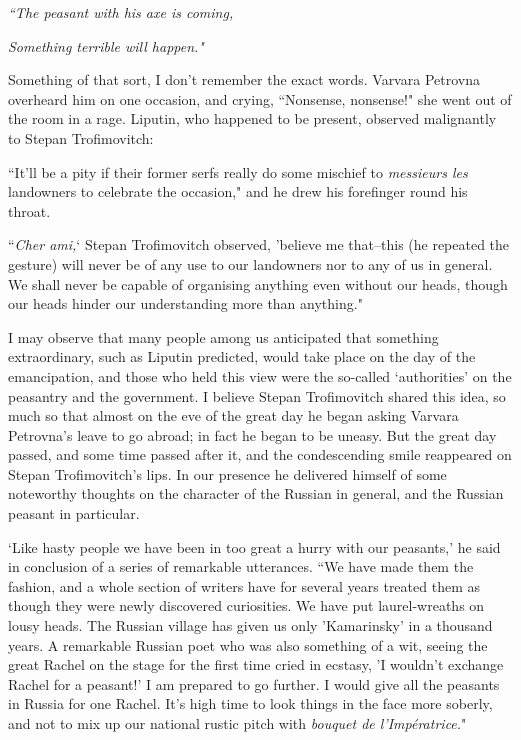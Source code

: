 \documentclass[12pt]{article}
\begin{document}
\vspace{12pt}
\emph{``The peasant with his axe is coming,}


\emph{Something terrible will happen."}




\vspace{12pt}
Something of that sort, I don't remember the exact words. Varvara
Petrovna overheard him on one occasion, and crying, ``Nonsense,
nonsense!" she went out of the room in a rage. Liputin, who happened to
be present, observed malignantly to Stepan Trofimovitch:


\vspace{12pt}
``It'll be a pity if their former serfs really do some mischief to
\emph{messieurs les} landowners to celebrate the occasion," and he drew his
forefinger round his throat.


\vspace{12pt}
``\emph{Cher ami,}` Stepan Trofimovitch observed, 'believe me that--this (he
repeated the gesture) will never be of any use to our landowners nor to
any of us in general. We shall never be capable of organising anything
even without our heads, though our heads hinder our understanding more
than anything."


\vspace{12pt}
I may observe that many people among us anticipated that something
extraordinary, such as Liputin predicted, would take place on the day
of the emancipation, and those who held this view were the so-called
`authorities' on the peasantry and the government. I believe Stepan
Trofimovitch shared this idea, so much so that almost on the eve of the
great day he began asking Varvara Petrovna's leave to go abroad; in fact
he began to be uneasy. But the great day passed, and some time
passed after it, and the condescending smile reappeared on Stepan
Trofimovitch's lips. In our presence he delivered himself of some
noteworthy thoughts on the character of the Russian in general, and the
Russian peasant in particular.


\vspace{12pt}
`Like hasty people we have been in too great a hurry with our peasants,'
he said in conclusion of a series of remarkable utterances. ``We have
made them the fashion, and a whole section of writers have for several
years treated them as though they were newly discovered curiosities. We
have put laurel-wreaths on lousy heads. The Russian village has given us
only 'Kamarinsky' in a thousand years. A remarkable Russian poet who was
also something of a wit, seeing the great Rachel on the stage for the
first time cried in ecstasy, 'I wouldn't exchange Rachel for a peasant!'
I am prepared to go further. I would give all the peasants in Russia
for one Rachel. It's high time to look things in the face more
soberly, and not to mix up our national rustic pitch with \emph{bouquet de
l'Impératrice.}"
\end{document}
